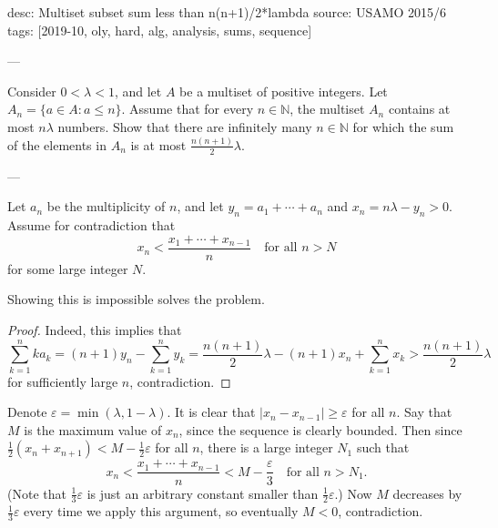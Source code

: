 desc: Multiset subset sum less than n(n+1)/2*lambda
source: USAMO 2015/6
tags: [2019-10, oly, hard, alg, analysis, sums, sequence]

---

Consider $0<\lambda<1$, and let $A$ be a multiset of positive integers. Let $A_n=\{a\in A:a\le n\}$. Assume that for every $n\in\mathbb N$, the multiset $A_n$ contains at most $n\lambda$ numbers. Show that there are infinitely many $n\in\mathbb N$ for which the sum of the elements in $A_n$ is at most $\frac{n(n+1)}2\lambda$.

---

Let $a_n$ be the multiplicity of $n$, and let $y_n=a_1+\cdots+a_n$ and $x_n=n\lambda-y_n>0$. Assume for contradiction that \[x_n<\frac{x_1+\cdots+x_{n-1}}n\quad\text{for all }n>N\]
for some large integer $N$.
\begin{claim*}
    Showing this is impossible solves the problem.
\end{claim*}
\begin{proof}
    Indeed, this implies that \[\sum_{k=1}^nka_k=(n+1)y_n-\sum_{k=1}^ny_k=\frac{n(n+1)}2\lambda-(n+1)x_n+\sum_{k=1}^nx_k>\frac{n(n+1)}2\lambda\]
    for sufficiently large $n$, contradiction.
\end{proof}

Denote $\varepsilon=\min(\lambda,1-\lambda)$. It is clear that $|x_n-x_{n-1}|\ge\varepsilon$ for all $n$. Say that $M$ is the maximum value of $x_n$, since the sequence is clearly bounded. Then since $\frac12(x_n+x_{n+1})<M-\frac12\varepsilon$ for all $n$, there is a large integer $N_1$ such that \[x_n<\frac{x_1+\cdots+x_{n-1}}n<M-\frac\varepsilon3\quad\text{for all }n>N_1.\]
(Note that $\frac13\varepsilon$ is just an arbitrary constant smaller than $\frac12\varepsilon$.) Now $M$ decreases by $\frac13\varepsilon$ every time we apply this argument, so eventually $M<0$, contradiction.
